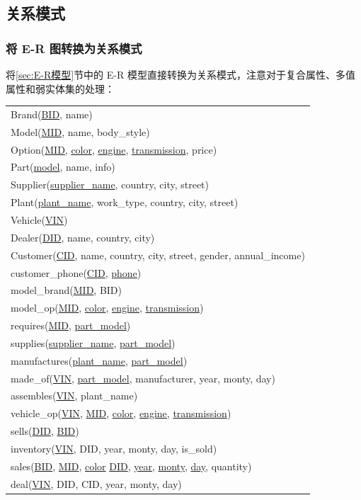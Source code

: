 \documentclass[hyperref,a4paper,UTF8]{ctexart}
\begin{document}
\subsection{关系模式}

\subsubsection{将 E-R 图转换为关系模式}

将\ref{sec:E-R模型}节中的 E-R 模型直接转换为关系模式，注意对于复合属性、多值属性和弱实体集的处理：

\begin{center}
    \begin{tabular}{l}
        Brand(\underline{BID}, name)\\
        Model(\underline{MID}, name, body\_style)\\
        Option(\underline{MID}, \underline{color}, \underline{engine}, \underline{transmission}, price)\\
        Part(\underline{model}, name, info)\\
        Supplier(\underline{supplier\_name}, country, city, street)\\
        Plant(\underline{plant\_name}, work\_type, country, city, street)\\
        Vehicle(\underline{VIN})\\
        Dealer(\underline{DID}, name, country, city)\\
        Customer(\underline{CID}, name, country, city, street, gender, annual\_income)\\
        customer\_phone(\underline{CID}, \underline{phone})\\
        model\_brand(\underline{MID}, BID)\\
        model\_op(\underline{MID}, \underline{color}, \underline{engine}, \underline{transmission})\\
        requires(\underline{MID}, \underline{part\_model})\\
        supplies(\underline{supplier\_name}, \underline{part\_model})\\
        manufactures(\underline{plant\_name}, \underline{part\_model})\\
        made\_of(\underline{VIN}, \underline{part\_model}, manufacturer, year, monty, day)\\
        assembles(\underline{VIN}, plant\_name)\\
        vehicle\_op(\underline{VIN}, \underline{MID}, \underline{color}, \underline{engine}, \underline{transmission})\\
        sells(\underline{DID}, \underline{BID})\\
        inventory(\underline{VIN}, DID, year, monty, day, is\_sold)\\
        sales(\underline{BID}, \underline{MID}, \underline{color} \underline{DID}, \underline{year}, \underline{monty}, \underline{day}, quantity)\\
        deal(\underline{VIN}, DID, CID, year, monty, day)
    \end{tabular}
\end{center}
\end{document}
